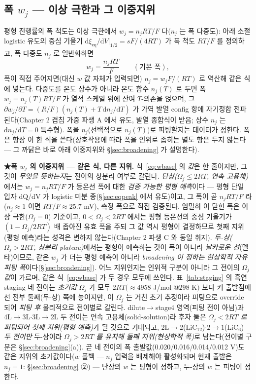\documentclass[11pt,a4paper]{article}
\newcommand{\dd}{\mathrm{d}}
\newcommand{\eq}{\mathrm{eq}}
\begin{document}
\subsection{폭 $w_j$ — 이상 극한과 그 이중지위}
평형 진행률의 폭 척도는 이상 극한에서 $w_j=n_jRT/F$ 다($n_j$ 는 폭 다중도): 아래 소절 logistic 유도의
중심 기울기 $\dd\xi_\eq/\dd V|_{1/2}=sF/(4RT)$ 가 폭 척도 $RT/F$ 를 정의하고, 폭 다중도 $n_j$ 로 일반화하면
\begin{equation}
w_j=\frac{n_jRT}{F}\qquad(\text{기본 폭}),
\label{eq:wbase}
\end{equation}
폭이 직접 주어지면(대신 $w$ 값 자체가 입력되면) $n_j=w_jF/(RT)$ 로 역산해 같은 식에 넣는다.
다중도를 온도 상수가 아니라 온도 함수 $n_j(T)$ 로 두면 폭 $w_j=n_j(T)RT/F$ 가 열적 스케일 위에 잔여 $T$-의존을
얹으며, 그 $\partial w_j/\partial T=(R/F)(n_j(T)+T\,\dd n_j/\dd T)$ 가 가역 발열 config 항에 자기정합 전파된다(Chapter 2
겹침 가중 파생 A 에서 유도, 발열 종합식이 받음; 상수 $n_j$ 는 $\dd n_j/\dd T{=}0$ 특수형). 폭을 $n_j$(선택적으로 $n_j(T)$)로 피팅할지는 데이터가 정한다.
폭은 항상 이 한 식을 쓴다(상호작용에 따라 폭을 인위로 좁히는 별도 항은 두지 않는다 — 그 까닭은 바로 아래
이중지위와 \S\ref{sec:broadening} 가 설명한다).

\textbf{★폭 $w_j$ 의 이중지위 — 같은 식, 다른 지위.} 식~\eqref{eq:wbase} 의 \emph{값}은 한 줄이지만, 그것이
\emph{무엇을 뜻하는지}는 전이의 상분리 여부로 갈린다. \emph{단상($\Omega_j\le2RT$, 연속 고용체)}에서는 $w_j=n_jRT/F$
가 등온선 폭에 대한 \emph{검증 가능한 평형 예측}이다 — 평형 단일 입자 dQ/dV 가 logistic
미분 종(\S\ref{sec:eqpeak} 에서 유도)이고, 그 폭이 곧 $n_jRT/F$ 라($n_j\!\approx\!1$ 이면 $RT/F\!\approx\!25.7$ mV), 측정 폭으로 직접 검증된다. 엄밀히 이 닫힌 폭은 이상 극한($\Omega_j=0$) 기준이고,
$0<\Omega_j<2RT$ 에서는 평형 등온선의 중심 기울기가 $(1-\Omega_j/2RT)$ 배 좁아진 유효 폭을 주되 그
값 역시 평형이 결정하므로 첫째 지위(평형 예측)라는 성격은 변하지 않는다(Chapter 2 파생 C 와 동일 취지).
\emph{두-상($\Omega_j>2RT$, 상분리 plateau)}에서는 평형이 예측하는 것이 폭이 아니라 \emph{날카로운 선}(델타)이므로,
같은 $w_j$ 가 더는 평형 예측이 아니라 \emph{broadening 이 정하는 현상학적 자유 피팅 폭}이다(\S\ref{sec:broadening}).
어느 지위인지는 인위적 구분이 아니라 그 전이의 \emph{$\Omega_j$ 값}이 가르며, 같은 식~\eqref{eq:wbase} 가 두 경우 모두에
쓰인다. 표~\ref{tab:staging} 의 흑연 staging 네 전이는 \emph{초기값} $\Omega_j$ 가 모두 $2RT(\!\approx\!4958$ J/mol
$@298$ K$)$ 보다 커 출발점에선 전부 둘째(두-상) 쪽에 놓이지만, 이 $\Omega_j$ 는 거친 초기 추정이라 피팅으로
override 되어 \emph{피팅 후} 물리적으로 전이별로 갈린다. dilute$\to$stage4 영역(피팅 전이 아님)과
4L$\to$3L$\cdot$3L$\to$2L 두 전이는
연속 고용체(solid-solution)라 후자 둘은 \emph{$\Omega_j<2RT$ 로 피팅되어 첫째 지위(평형 예측)}가 될 것으로 기대되고,
$2\mathrm L\!\to\!2$($\mathrm{LiC_{12}}$)$\cdot$$2\!\to\!1$($\mathrm{LiC_6}$) \emph{두 전이만} 두-상이라
\emph{$\Omega_j>2RT$ 를 유지해 둘째 지위(현상학적 폭)}로 남는다(전이별 구분은 \S\ref{sec:broadening}(a)).
곧 네 전이의 폭 출발값(0.020/0.016/0.014/0.012 V)도 같은 지위의 초기값이다($w$ 폴백 — $n_j$ 입력을
배제해야 활성화되며 현재 출발은 $n_j{=}1$: \S\ref{sec:broadening} ②) — 단상의 $w$ 는 평형이
정하고, 두-상의 $w$ 는 피팅이 정한다.
\end{document}
